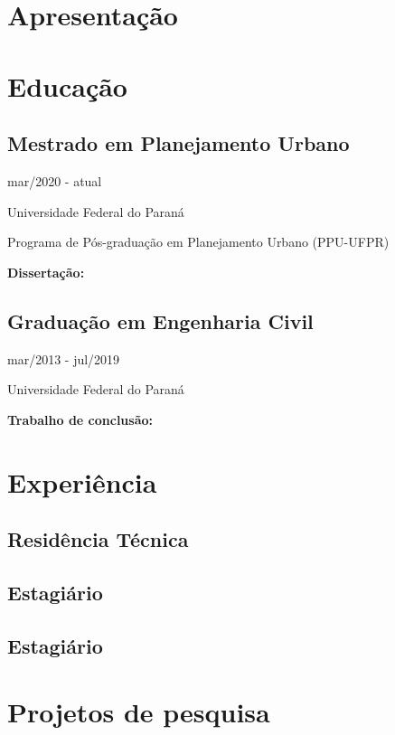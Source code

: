 \documentclass{article}
\author{Pedro Augusto Borges dos Santos}
\begin{document}
\section{Apresentação}

\section{Educação}

\subsection{Mestrado em Planejamento Urbano}

\hspace*{\fill} mar/2020 - atual

Universidade Federal do Paraná

Programa de Pós-graduação em Planejamento Urbano (PPU-UFPR)

\textbf{Dissertação:}

\subsection{Graduação em Engenharia Civil}

\hspace*{\fill} mar/2013 - jul/2019

Universidade Federal do Paraná

\textbf{Trabalho de conclusão:}

\section{Experiência}

\subsection{Residência Técnica}

\subsection{Estagiário}

\subsection{Estagiário}

\section{Projetos de pesquisa}
\end{document}
